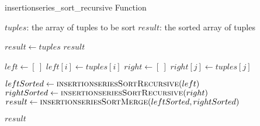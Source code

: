         \begin{frame}[containsverbatim]{\insertionseriessortrecursivefunctionframe}
            \begingroup
                \makeatletter
                \renewcommand{\alglinenumber}[1]{\tiny#1}
                \makeatother
                \begin{algorithm}[H]
                    \tiny
                    \caption{insertionseries\_sort\_recursive Function} \label{insertionseries_sort_recursive function}
                    \begin{multicols}{2}
                        \begin{algorithmic}[1]
                            \Require 
                                \Statex $tuples$: the array of tuples to be sort
                            \Ensure
                                \Statex $result$: the sorted array of tuples
                            \Statex
            
                                    \State $result \gets tuples$
                                    \State \Return $result$
                                \EndIf
        
                                \State $left \gets \left[\ \right]$
                                    \State $left{\left[i\right]} \gets tuples{\left[i\right]}$
                                \EndFor
                                \State $right \gets \left[\ \right]$
                                    \State $right{\left[j\right]} \gets tuples{\left[j\right]}$
                                \EndFor
        
                                \State $leftSorted \gets \Call{insertionseriesSortRecursive}{left}$
                                \State $rightSorted \gets \Call{insertionseriesSortRecursive}{right}$
                                \State $result \gets \Call{insertionseriesSortMerge}{leftSorted, rightSorted}$
        
                                \State \Return $result$
                            \EndFunction
                        \end{algorithmic}
                    \end{multicols}
                \end{algorithm}
            \endgroup
        \end{frame}

